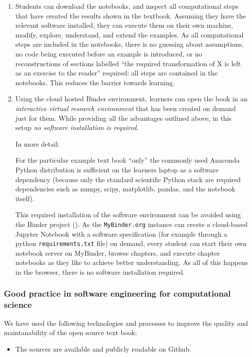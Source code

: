 \documentclass{deliverablereport}
\begin{document}
\begin{enumerate}
\item Students can download the notebooks, and inspect all
  computational steps that have created the results shown in the
  textbook. Assuming they have the relevant software installed,
  they can execute them on their own machine, modify,
  explore, understand, and extend the examples. As all computational
  steps are included in the notebooks, there is no guessing about
  assumptions, no code being executed before an example is introduced,
  or no reconstructions of sections labelled ``the required
  transformation of X is left as an exercise to the reader'' required:
  all steps are contained in the notebooks. This reduces the barrier
  towards learning.

\item Using the cloud hosted Binder environment, learners can open
  the book in an \emph{interactive virtual research environment} that
  has been created on demand just for them. While providing all the
  advantages outlined above, in this setup \emph{no software
    installation is required}.

  In more detail:

  For the particular example text book ``only'' the commonly used
  Anaconda Python distribution is sufficient on the learners laptop as
  a software dependency (because  only the standard scientific Python stack
  are required dependencies such as numpy, scipy, matplotlib, pandas,
  and the notebook itself).

  This required installation of the software environment can be
  avoided using the Binder project (). As the
  \texttt{MyBinder.org} instance can create a cloud-based Jupyter
  Notebook with a software specification (for example through a python
  \texttt{requirements.txt} file) on demand, every student can start
  their own notebook server on MyBinder, browse chapters, and execute
  chapter notebooks as they like to achieve better understanding. As
  all of this happens in the browser, there is no software
  installation required.
\end{enumerate}

\subsubsection{Good practice in software engineering for
  computational science}

We have used the following technologies and processes to improve the
quality and maintanability of the open source text book:
\begin{itemize}
\item The sources are available and publicly readable on Github.
\end{itemize}

\newpage\printbibliography
\end{document}
